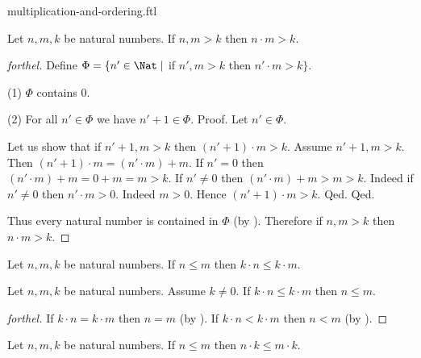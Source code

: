 \documentclass{naproche-library}
\begin{document}
\begin{smodule}{multiplication-and-ordering.ftl}
  \begin{proposition}[forthel,id=ARITHMETIC_06_1826268599287808]
    Let $n, m, k$ be natural numbers.
    If $n, m > k$ then $n \cdot m > k$.
  \end{proposition}
  \begin{proof}[forthel]
    Define $\Phi = \{ n' \in \Nat \mid$ if $n', m > k$ then $n' \cdot m > k \}$.

    (1) $\Phi$ contains $0$.

    (2) For all $n' \in \Phi$ we have $n' + 1 \in \Phi$. \newline
    Proof.
      Let $n' \in \Phi$.

      Let us show that if $n' + 1, m > k$ then $(n' + 1) \cdot m > k$.
        Assume $n' + 1, m > k$.
        Then $(n' + 1) \cdot m = (n' \cdot m) + m$.
        If $n' = 0$ then
        $(n' \cdot m) + m
          = 0 + m
          = m
          > k$.
        If $n' \neq 0$ then
        $(n' \cdot m) + m
          > m
          > k$.
        Indeed if $n' \neq 0$ then $n' \cdot m > 0$.
        Indeed $m > 0$.
        Hence $(n' + 1) \cdot m > k$.
      Qed.
    Qed.

    Thus every natural number is contained in $\Phi$ (by ).
    Therefore if $n, m > k$ then $n \cdot m > k$.
  \end{proof}

  \begin{corollary}[forthel,id=ARITHMETIC_06_1751605544222720]
    Let $n, m, k$ be natural numbers.
    If $n \leq m$ then $k \cdot n \leq k \cdot m$.
  \end{corollary}

  \begin{corollary}[forthel,id=ARITHMETIC_06_3965209318260736]
    Let $n, m, k$ be natural numbers.
    Assume $k \neq 0$.
    If $k \cdot n \leq k \cdot m$ then $n \leq m$.
  \end{corollary}
  \begin{proof}[forthel]
    If $k \cdot n = k \cdot m$ then $n = m$ (by ).
    If $k \cdot n < k \cdot m$ then $n < m$ (by ).
  \end{proof}

  \begin{corollary}[forthel,id=ARITHMETIC_06_8946886668976128]
    Let $n, m, k$ be natural numbers.
    If $n \leq m$ then $n \cdot k \leq m \cdot k$.
  \end{corollary}


\end{smodule}
\end{document}
